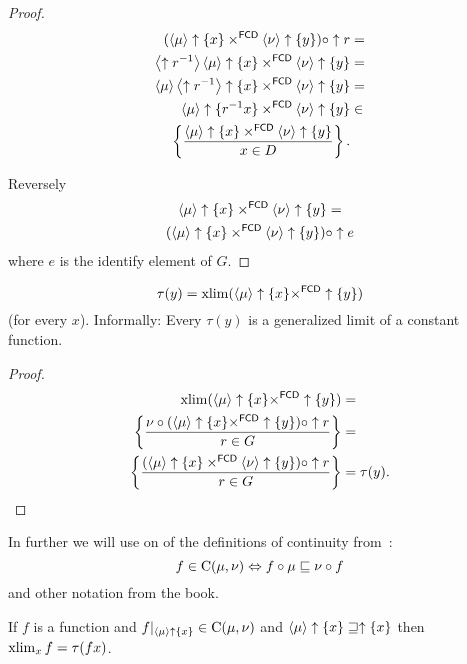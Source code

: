 \begin{proof}
~
\begin{align*}
(\left\langle \mu\right\rangle\uparrow\{x\}\times^{\mathsf{FCD}}\left\langle \nu\right\rangle\uparrow\{y\})\circ\uparrow r & =\\
\left\langle \uparrow r^{-1}\right\rangle\left\langle \mu\right\rangle\uparrow\{x\}\times^{\mathsf{FCD}}\left\langle \nu\right\rangle\uparrow\{y\} & =\\
\left\langle \mu\right\rangle\left\langle \uparrow r^{-1}\right\rangle\uparrow\{x\}\times^{\mathsf{FCD}}\left\langle \nu\right\rangle\uparrow\{y\} & =\\
\left\langle \mu\right\rangle\uparrow\{r^{-1}x\}\times^{\mathsf{FCD}}\left\langle \nu\right\rangle\uparrow\{y\} & \in \\ \left\{ \frac{\left\langle \mu\right\rangle\uparrow\{x\}\times^{\mathsf{FCD}}\left\langle \nu\right\rangle\uparrow\{y\}}{x\in D}\right\}.
\end{align*}


Reversely
\begin{multline*}
\left\langle \mu\right\rangle\uparrow\{x\}\times^{\mathsf{FCD}}\left\langle \nu\right\rangle\uparrow\{y\}=\\(\left\langle \mu\right\rangle\uparrow\{x\}\times^{\mathsf{FCD}}\left\langle \nu\right\rangle\uparrow\{y\})\circ\uparrow e
\end{multline*}
where $e$ is the identify element of $G$.\end{proof}

\begin{prop}
\[ \tau(y)=\operatorname{xlim}(\left\langle \mu\right\rangle\uparrow\{x\}\times^{\mathsf{FCD}}\uparrow\{y\}) \]
(for every $x$). Informally: Every $\tau(y)$ is a generalized limit
of a constant function.
\end{prop}

\begin{proof}
~
\begin{align*}
\operatorname{xlim}(\left\langle \mu\right\rangle\uparrow\{x\}\times^{\mathsf{FCD}}\uparrow\{y\}) & =\\
\left\{ \frac{\nu\circ(\left\langle \mu\right\rangle\uparrow\{x\}\times^{\mathsf{FCD}}\uparrow\{y\})\circ\uparrow r}{r\in G}\right\} & =\\
\left\{ \frac{(\left\langle \mu\right\rangle\uparrow\{x\}\times^{\mathsf{FCD}}\left\langle \nu\right\rangle\uparrow\{y\})\circ\uparrow r}{r\in G}\right\} & =\tau(y).
\end{align*}
\end{proof}

In further we will use on of the definitions of continuity from~\cite{volume-1-edition1}:
\[ f\in\mathrm{C}(\mu,\nu)\Leftrightarrow
f\circ\mu \sqsubseteq \nu\circ f \]
and other notation from the book.

\begin{thm}
If $f$ is a function and $f|_{\left\langle \mu\right\rangle\uparrow\{x\}}\in\mathrm{C}(\mu,\nu)$
and $\left\langle \mu\right\rangle\uparrow\{x\}\sqsupseteq\uparrow\{x\}$
then $\operatorname{xlim}_{x}f=\tau(fx)$.\end{thm}

